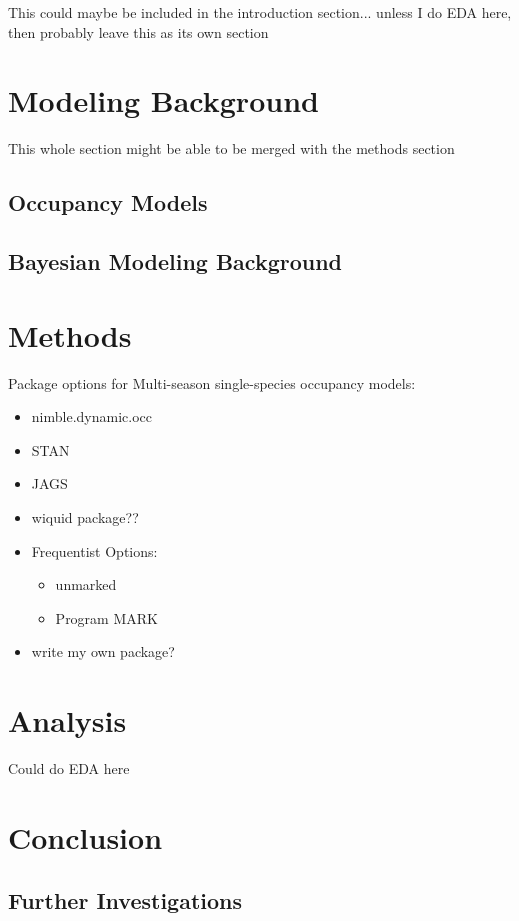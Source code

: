\documentclass[12pt]{article}\usepackage[]{graphicx}\usepackage[]{color}
\begin{document}
This could maybe be included in the introduction section... unless I do EDA here, then probably leave this as its own section



\section{Modeling Background}

This whole section might be able to be merged with the methods section 

\subsection{Occupancy Models}
 
\subsection{Bayesian Modeling Background}

\section{Methods}

Package options for Multi-season single-species occupancy models: 
\begin{itemize}
\item nimble.dynamic.occ
\item STAN
\item JAGS
\item wiquid package??
\item Frequentist Options: 
  \begin{itemize}
  \item unmarked
  \item Program MARK
  \end{itemize}
\item write my own package? 
\end{itemize}

\section{Analysis}

Could do EDA here

\section{Conclusion}

\subsection{Further Investigations}
\end{document}

